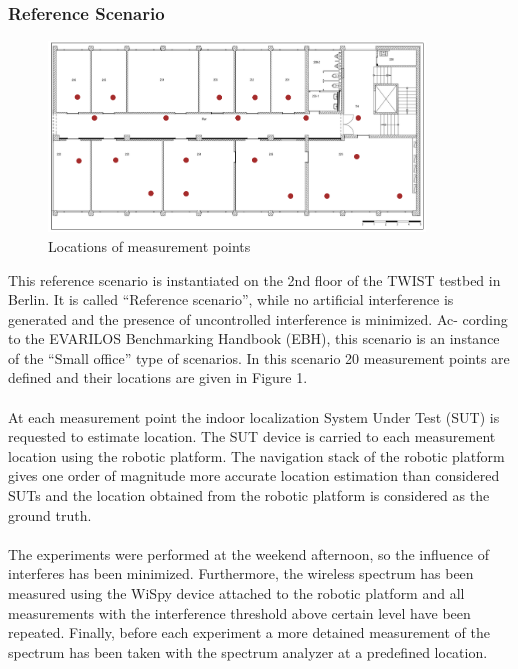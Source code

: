 \documentclass[11pt,a4paper,headinclude,footinclude,chapterprefix=on]{scrreprt}
\begin{document}
\subsubsection{Reference Scenario} 
\begin{figure}
	[!] \centering 
	\includegraphics[width=100mm]{Images/floor} \caption{Locations of measurement points} \label{fig:floor} 
\end{figure}

This reference scenario is instantiated on the 2nd floor of the TWIST testbed in Berlin. It is called “Reference scenario”, while no artificial interference is generated and the presence of uncontrolled interference is minimized. Ac- cording to the EVARILOS Benchmarking Handbook (EBH), this scenario is an instance of the “Small office” type of scenarios. In this scenario 20 measurement points are defined and their locations are given in Figure 1.

\paragraph{} At each measurement point the indoor localization System Under Test (SUT) is requested to estimate location. The SUT device is carried to each measurement location using the robotic platform. The navigation stack of the robotic platform gives one order of magnitude more accurate location estimation than considered SUTs and the location obtained from the robotic platform is considered as the ground truth.

\paragraph{} The experiments were performed at the weekend afternoon, so the influence of interferes has been minimized. Furthermore, the wireless spectrum has been measured using the WiSpy device attached to the robotic platform and all measurements with the interference threshold above certain level have been repeated. Finally, before each experiment a more detained measurement of the spectrum has been taken with the spectrum analyzer at a predefined location.
\end{document}
